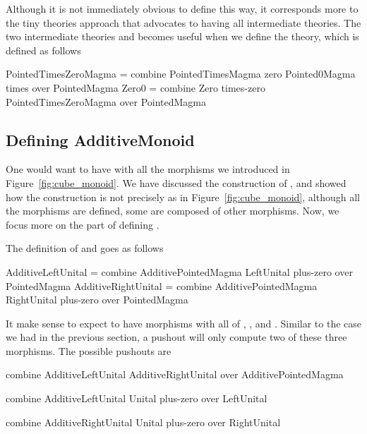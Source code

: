 Although it is not immediately obvious to define  this way, it corresponds more to the tiny theories approach that advocates to having all intermediate theories. The two intermediate theories  and  becomes useful when we define the  theory, which is defined as follows 
\begin{togcode}
PointedTimesZeroMagma = 
  combine PointedTimesMagma zero Pointed0Magma times 
  over PointedMagma 
Zero0 = 
  combine Zero times-zero PointedTimesZeroMagma {} 
  over PointedMagma 
\end{togcode}

\subsection{Defining AdditiveMonoid}
One would want to have  with all the morphisms we introduced in Figure~\ref{fig:cube_monoid}. %
We have discussed the construction of , and showed how the construction is not precisely as in Figure~\ref{fig:cube_monoid}, although all the morphisms are defined, some are composed of other morphisms. Now, we focus more on the part of defining . 

\noindent The definition of  and  goes as follows 
\begin{togcode}
AdditiveLeftUnital = 
  combine AdditivePointedMagma {} LeftUnital plus-zero 
  over PointedMagma
AdditiveRightUnital = 
  combine AdditivePointedMagma {} RightUnital plus-zero 
  over PointedMagma
\end{togcode} 
\noindent It make sense to expect  to have morphisms with all of , , and . Similar to the case we had in the previous section, a pushout will only compute two of these three morphisms. The possible pushouts are 
\begin{togcode}
combine AdditiveLeftUnital {} AdditiveRightUnital {} 
over AdditivePointedMagma
\end{togcode}

\begin{togcode}
combine AdditiveLeftUnital {} Unital plus-zero 
over LeftUnital 
\end{togcode}

\begin{togcode}
combine AdditiveRightUnital {} Unital plus-zero 
over RightUnital 
\end{togcode}

